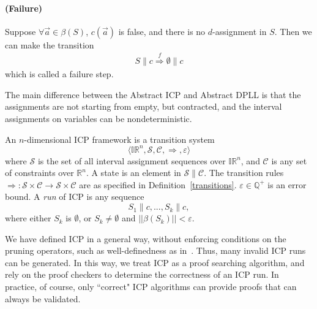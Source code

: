 \documentclass[envcountsect]{llncs}
\begin{document}
\begin{definition}
\paragraph{(Failure)} Suppose $\forall \vec a\in \beta(S)$, $c(\vec a)$ is
false, and there is no $d$-assignment in $S$. Then we can make the transition
\begin{eqnarray*}
S\parallel c \stackrel{f}{\Longrightarrow} \emptyset\parallel c
\end{eqnarray*}
which is called a failure step.
\end{definition}
\begin{remark}
The main difference between the Abstract ICP and Abstract DPLL
is  that the assignments are not starting from empty, but contracted, and the
interval assignments on variables can be nondeterministic.
\end{remark}
\begin{definition}
An $n$-dimensional ICP framework is a transition system
$$\langle \mathbb{IR}^n, \mathcal{S}, \mathcal{C}, \Longrightarrow,
\varepsilon\rangle$$
where $\mathcal{S}$ is the set of all interval assignment sequences over
$\mathbb{IR}^n$, and $\mathcal{C}$ is any set of constraints over
$\mathbb{R}^n$. A state is an element in $\mathcal{S}\parallel \mathcal{C}$. The
transition rules $\Longrightarrow: \mathcal{S}\times \mathcal{C}\rightarrow
\mathcal{S} \times \mathcal{C}$ are as specified in
Definition~\ref{transitions}. $\varepsilon\in \mathbb{Q}^+$ is an
error bound. A {\em run} of ICP is any sequence
$$S_1\parallel c, ... , S_k\parallel c,$$
where either $S_k$ is $\emptyset$, or $S_k\neq \emptyset$ and
$||\beta(S_k)||<\varepsilon$.
\end{definition}
\begin{remark}
We have defined ICP in a general way, without enforcing conditions
on the pruning operators, such as well-definedness as in~\cite{}. Thus, many
invalid ICP runs can be generated. In this way, we treat ICP as a proof
searching algorithm, and rely on the proof checkers to determine the correctness
of an ICP run. In practice, of course, only ``correct" ICP algorithms can
provide proofs that can always be validated.
\end{remark}
\end{document}

